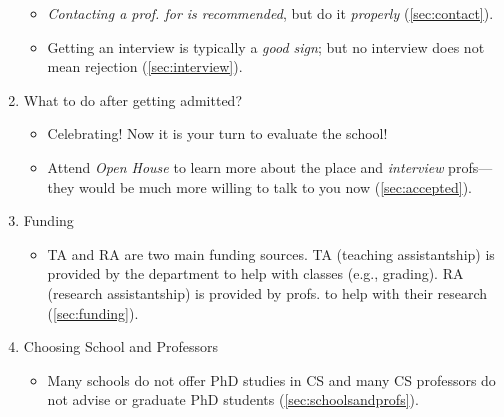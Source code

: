 \documentclass[oneside,11pt,dvipsnames]{book}
\begin{document}
\begin{enumerate}
\begin{itemize}
          \item \emph{Contacting a prof. for is recommended}, but do it \emph{properly} (\autoref{sec:contact}).

          \item Getting an interview is typically a \emph{good sign}; but no interview does not mean rejection (\autoref{sec:interview}).

        \end{itemize}
  \item What to do after getting admitted?
        \begin{itemize}
                \item  Celebrating! Now it is your turn to evaluate the school!
          \item Attend \emph{Open House} to learn more about the place and \emph{interview} profs---they would be much more willing to talk to you now (\autoref{sec:accepted}).
        \end{itemize}
  \item Funding
        \begin{itemize}
          \item TA and RA are two main funding sources.  TA (teaching assistantship) is provided by the department to help with classes (e.g., grading). RA (research assistantship) is provided by profs. to help with their research (\autoref{sec:funding}).
        \end{itemize}
  \item Choosing School and Professors
        \begin{itemize}
          \item Many schools do not offer PhD studies in CS and many CS professors do not advise or graduate PhD students  (\autoref{sec:schoolsandprofs}).
        \end{itemize}


\end{enumerate}
\end{document}
